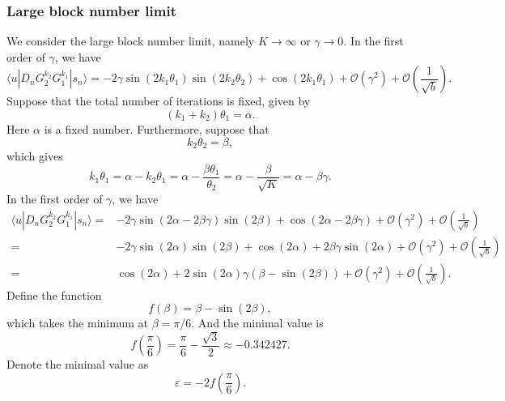 \documentclass[a4paper,10pt]{article}
\numberwithin{equation}{section}
\begin{document}
\subsubsection{Large block number limit}

We consider the large block number limit, namely $K\rightarrow\infty$ or $\gamma\rightarrow 0$. In the first order of $\gamma$, we have
\begin{equation}
    \langle u|D_nG_2^{k_2}G_1^{k_1}|s_n\rangle = -2\gamma \sin(2k_1\theta_1)\sin(2k_2\theta_2) + \cos(2k_1\theta_1) + \mathcal O\left(\gamma^2\right) + \mathcal O\left(\frac{1}{\sqrt b}\right).
\end{equation}
Suppose that the total number of iterations is fixed, given by
\begin{equation}
    (k_1+k_2)\theta_1 = \alpha.
\end{equation}
Here $\alpha$ is a fixed number. Furthermore, suppose that
\begin{equation}
    k_2\theta_2 = \beta,
\end{equation}
which gives 
\begin{equation}
    k_1\theta_1 = \alpha - k_2\theta_1 = \alpha - \frac{\beta\theta_1}{\theta_2} = \alpha - \frac{\beta}{\sqrt K} = \alpha - \beta\gamma.
\end{equation}
In the first order of $\gamma$, we have
\begin{align}
    \langle u|D_nG_2^{k_2}G_1^{k_1}|s_n\rangle = & -2\gamma \sin(2\alpha-2\beta\gamma)\sin(2\beta) + \cos(2\alpha-2\beta\gamma) + \mathcal O\left(\gamma^2\right) + \mathcal O\left(\frac{1}{\sqrt b}\right) \nonumber \\
    = & -2\gamma\sin(2\alpha)\sin(2\beta) + \cos(2\alpha) + 2\beta\gamma\sin(2\alpha) + \mathcal O\left(\gamma^2\right) + \mathcal O\left(\frac{1}{\sqrt b}\right) \nonumber \\
    = & \cos(2\alpha) + 2\sin(2\alpha)\gamma(\beta - \sin(2\beta)) + \mathcal O\left(\gamma^2\right) + \mathcal O\left(\frac{1}{\sqrt b}\right).
\end{align}
Define the function
\begin{equation}
    f(\beta) = \beta - \sin(2\beta),
\end{equation}
which takes the minimum at $\beta = \pi/6$. And the minimal value is 
\begin{equation}
    f\left(\frac{\pi}{6}\right) = \frac{\pi}{6} - \frac{\sqrt 3}{2} \approx -0.342427.
\end{equation}
Denote the minimal value as
\begin{equation}
    \varepsilon = -2f\left(\frac{\pi}{6}\right).
\end{equation}
\end{document}
